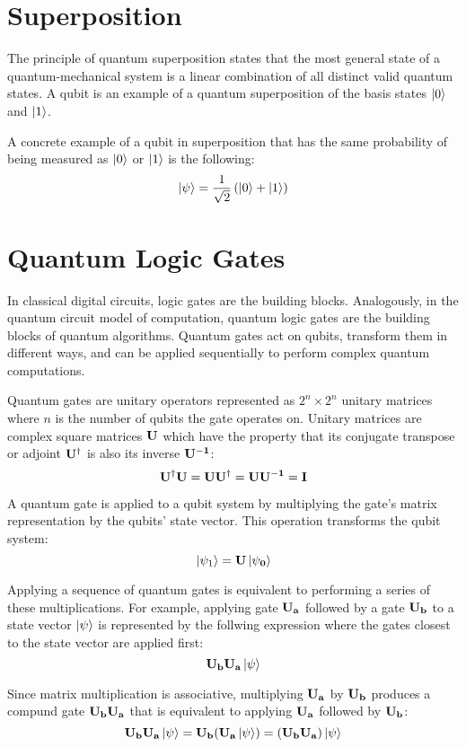\section{Superposition}

The principle of quantum superposition states that the most general state of a quantum-mechanical system is a linear combination of all distinct valid quantum states. A qubit is an example of a quantum superposition of the basis states $\left|{0}\right\rangle$ and $\left|{1}\right\rangle$.

A concrete example of a qubit in superposition that has the same probability of being measured as $\left|{0}\right\rangle$ or $\left|{1}\right\rangle$ is the following:
$$\left|{\psi}\right\rangle=\frac{1}{\sqrt{2}}\left(\left|{0}\right\rangle+\left|{1}\right\rangle\right)$$


\section{Quantum Logic Gates}

In classical digital circuits, logic gates are the building blocks. Analogously, in the quantum circuit model of computation, quantum logic gates are the building blocks of quantum algorithms. Quantum gates act on qubits, transform them in different ways, and can be applied sequentially to perform complex quantum computations.

Quantum gates are unitary operators represented as $2^n \times 2^n$ unitary matrices where $n$ is the number of qubits the gate operates on. Unitary matrices are complex square matrices $\bf{U}$ which have the property that its conjugate transpose or adjoint $\bf{U^{\dagger}}$ is also its inverse $\bf{U^{-1}}$:
$$\bf{U^{\dagger}U}=\bf{UU^{\dagger}}=\bf{UU^{-1}}=I$$

A quantum gate is applied to a qubit system by multiplying the gate's matrix representation by the qubits' state vector. This operation transforms the qubit system:
$$\left|{\psi_1}\right\rangle=\bf{U}\left|{\psi_0}\right\rangle$$

Applying a sequence of quantum gates is equivalent to performing a series of these multiplications. For example, applying gate $\bf{U_a}$ followed by a gate $\bf{U_b}$ to a state vector $\left|{\psi}\right\rangle$ is represented by the follwing expression where the gates closest to the state vector are applied first:
$$\bf{U_b}\bf{U_a}\left|{\psi}\right\rangle$$

Since matrix multiplication is associative, multiplying $\bf{U_a}$ by $\bf{U_b}$ produces a compund gate $\bf{U_{b}U_{a}}$ that is equivalent to applying $\bf{U_a}$ followed by $\bf{U_b}$:
$$\bf{U_b}\bf{U_a}\left|{\psi}\right\rangle=\bf{U_b}(\bf{U_a}\left|{\psi}\right\rangle)=(\bf{U_b}\bf{U_a})\left|{\psi}\right\rangle$$

